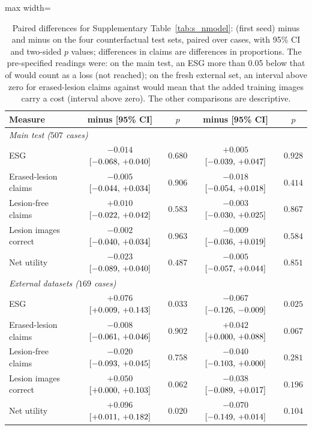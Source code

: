 \begin{table}[!htbp]
\caption{Paired differences for Supplementary Table~\ref{tab:s_nmodel}: \msn{} (first seed) minus \ms{} and minus \msp{} on the four counterfactual test sets, paired over cases, with 95\% CI and two-sided $p$ values; differences in claims are differences in proportions. The pre-specified readings were: on the main test, an ESG more than 0.05 below that of \ms{} would count as a loss (not reached); on the fresh external set, an interval above zero for erased-lesion claims against \msp{} would mean that the added training images carry a cost (interval above zero). The other comparisons are descriptive.}
\label{tab:s_next}
\centering
\footnotesize
\begin{adjustbox}{max width=\linewidth}
\begin{tabular}{l cc cc}
\toprule
Measure & \msn{} minus \ms{} [95\% CI] & $p$ & \msn{} minus \msp{} [95\% CI] & $p$ \\
\midrule
\multicolumn{5}{l}{\emph{Main test ($507$ cases)}} \\
ESG & $-0.014$ $[-0.068,\,+0.040]$ & $0.680$ & $+0.005$ $[-0.039,\,+0.047]$ & $0.928$ \\
Erased-lesion claims & $-0.005$ $[-0.044,\,+0.034]$ & $0.906$ & $-0.018$ $[-0.054,\,+0.018]$ & $0.414$ \\
Lesion-free claims & $+0.010$ $[-0.022,\,+0.042]$ & $0.583$ & $-0.003$ $[-0.030,\,+0.025]$ & $0.867$ \\
Lesion images correct & $-0.002$ $[-0.040,\,+0.034]$ & $0.963$ & $-0.009$ $[-0.036,\,+0.019]$ & $0.584$ \\
Net utility & $-0.023$ $[-0.089,\,+0.040]$ & $0.487$ & $-0.005$ $[-0.057,\,+0.044]$ & $0.851$ \\
\midrule
\multicolumn{5}{l}{\emph{External datasets ($169$ cases)}} \\
ESG & $+0.076$ $[+0.009,\,+0.143]$ & $0.033$ & $-0.067$ $[-0.126,\,-0.009]$ & $0.025$ \\
Erased-lesion claims & $-0.008$ $[-0.061,\,+0.046]$ & $0.902$ & $+0.042$ $[+0.000,\,+0.088]$ & $0.067$ \\
Lesion-free claims & $-0.020$ $[-0.093,\,+0.045]$ & $0.758$ & $-0.040$ $[-0.103,\,+0.000]$ & $0.281$ \\
Lesion images correct & $+0.050$ $[+0.000,\,+0.103]$ & $0.062$ & $-0.038$ $[-0.089,\,+0.017]$ & $0.196$ \\
Net utility & $+0.096$ $[+0.011,\,+0.182]$ & $0.020$ & $-0.070$ $[-0.149,\,+0.014]$ & $0.104$ \\

\end{tabular}
\end{adjustbox}
\end{table}
